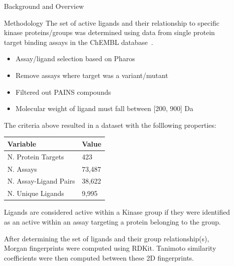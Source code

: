\documentclass[final]{beamer}
\newlength{\sepwidth}
\newlength{\colwidth}
\newcommand{\separatorcolumn}{\begin{column}{\sepwidth}\end{column}}
\begin{document}
\begin{frame}[t]
\begin{columns}[t]
\begin{column}{\colwidth}
\begin{block}{Background and Overview}
  \end{block}

  \begin{block}{Methodology}
    \small
    The set of active ligands and their relationship to specific kinase proteins/groups was determined using data from single protein target binding assays in the ChEMBL database~\cite{chembl_db_2023}. 
    \begin{itemize}
        \item Assay/ligand selection based on Pharos~\cite{pharos_2022}
        \item Remove assays where target was a variant/mutant
        \item Filtered out PAINS compounds
        \item Molecular weight of ligand must fall between [200, 900] Da
    \end{itemize}

    The criteria above resulted in a dataset with the folllowing properties:

    \begin{table}[!ht]
    \centering
    \begin{tabular}{l|l}
        \hline
        \textbf{Variable} & \textbf{Value} \\ \hline
        N. Protein Targets & 423 \\ \hline
        N. Assays & 73,487 \\ \hline
        N. Assay-Ligand Pairs & 38,622 \\ \hline
        N. Unique Ligands & 9,995 \\ \hline
    \end{tabular}
    \end{table}

    Ligands are considered active within a Kinase group if they were identified as an active within an assay targeting a protein belonging to the group. 

    After determining the set of ligands and their group relationship(s), Morgan fingerprints were computed using RDKit. Tanimoto similarity coefficients were then computed between these 2D fingerprints. 

  \end{block}
\end{column}

\separatorcolumn

\begin{column}{\colwidth}


\end{column}
\end{columns}
\end{frame}
\end{document}
